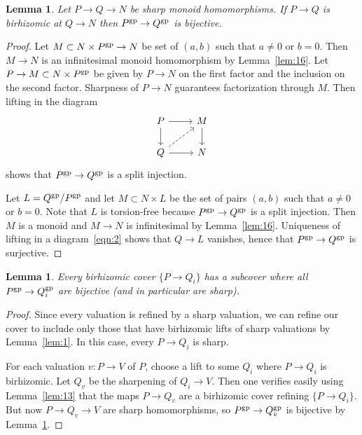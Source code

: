 \documentclass[10pt]{article}
\numberwithin{equation}{section}
\newtheorem{lemma}[paragraph]{Lemma}
\theoremstyle{definition}
\theoremstyle{remark}
\newcommand{\gp}[1]{#1^{\rm gp}}
\begin{document}
\begin{lemma} \label{lem:8}
	Let $P \to Q \to N$ be sharp monoid homomorphisms.  If $P \to Q$ is birhizomic at $Q \to N$ then $\gp P \to \gp Q$ is bijective.
\end{lemma}
\begin{proof}
	Let $M \subset N \times \gp P \to N$ be set of $(a,b)$ such that $a \neq 0$ or $b = 0$.  Then $M \to N$ is an infinitesimal monoid homomorphism by Lemma~\ref{lem:16}.   Let $P \to M \subset N \times \gp P$ be given by $P \to N$ on the first factor and the inclusion on the second factor.  Sharpness of $P \to N$ guarantees factorization through $M$.  Then lifting in the diagram
	\begin{equation} \label{eqn:2}
		\begin{tikzcd}
			P \ar[r] \ar[d] & M \ar[d] \\
			Q \ar[ur,dashed] \ar[r] & N
		\end{tikzcd}
	\end{equation}
	shows that $\gp P \to \gp Q$ is a split injection.

	Let $L = \gp Q / \gp P$ and let $M \subset N \times L$ be the set of pairs $(a,b)$ such that $a \neq 0$ or $b = 0$.  Note that $L$ is torsion-free because $\gp P \to \gp Q$ is a split injection.  Then $M$ is a monoid and $M \to N$ is infinitesimal by Lemma~\ref{lem:16}.  Uniqueness of lifting in a diagram~\eqref{eqn:2} shows that $Q \to L$ vanishes, hence that $\gp P \to \gp Q$ is surjective.
\end{proof}







\begin{lemma} \label{lem:14}
	Every birhizomic cover $\{ P \to Q_i \}$ has a subcover where all $P^{\rm gp} \to Q_i^{\rm gp}$ are bijective (and in particular are sharp).
\end{lemma}
\begin{proof}
Since every valuation is refined by a sharp valuation, we can refine our cover to include only those that have birhizomic lifts of sharp valuations by Lemma~\ref{lem:1}.  In this case, every $P \to Q_i$ is sharp.

	For each valuation $v : P \to V$ of $P$, choose a lift to some $Q_i$ where $P \to Q_i$ is birhizomic.  Let $Q_v$ be the sharpening of $Q_i \to V$.  Then one verifies easily using Lemma~\ref{lem:13} that the maps $P \to Q_v$ are a birhizomic cover refining $\{ P \to Q_i \}$.  But now $P \to Q_v \to V$ are sharp homomorphisms, so $\gp P \to \gp Q_v$ is bijective by Lemma~\ref{lem:8}.
\end{proof}
\end{document}
